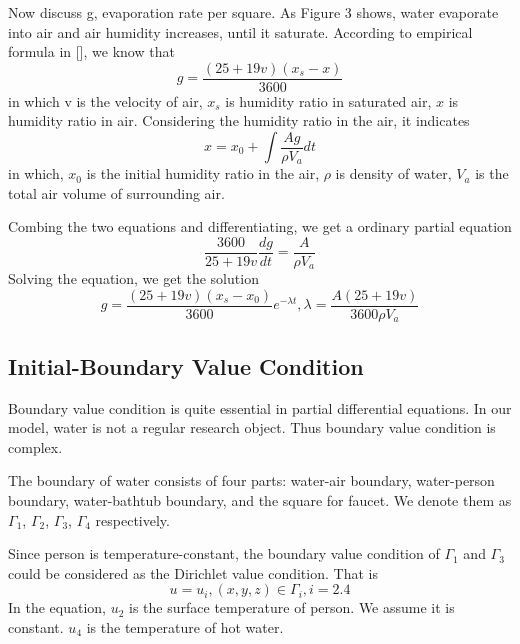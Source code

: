 \documentclass[12pt,a4paper,titlepage]{article}
\begin{document}
Now discuss g, evaporation rate per square.
As Figure 3 shows, water evaporate into air and air humidity increases, until it saturate. According to empirical formula in [], we know that
\begin{equation}
 g=\frac{(25+19v)({x_s}-x)}{3600}
\end{equation}
in which v is the velocity of air, ${x_s}$ is humidity ratio in saturated air, $x$ is humidity ratio in air.
Considering the humidity ratio in the air, it indicates
\begin{equation}
 x=x_0+\int \frac{Ag}{\rho V_a}dt
\end{equation}
in which, $x_0$ is the initial humidity ratio in the air, $\rho$ is density of water, $V_a$ is the total air volume of surrounding air.

Combing the two equations and differentiating, we get a ordinary partial equation
\begin{equation}
 \frac{3600}{25+19v} \frac{dg}{dt}=\frac{A}{\rho {V_a}}
\end{equation}
Solving the equation, we get the solution
\begin{equation}
 g=\frac{(25+19v)({x_s}-{x_0})}{3600}e^{-\lambda t}, \lambda =\frac{A(25+19v)}{3600\rho {V_a}}
\end{equation}


\subsection{Initial-Boundary Value Condition}
\label{initial-boundary value condition}

Boundary value condition is quite essential in partial differential equations. In our model, water is not a regular research object.
Thus boundary value condition is complex.

The boundary of water consists of four parts: water-air boundary, water-person boundary, water-bathtub boundary, and the square for faucet. We denote them as
${\Gamma}_1$, ${\Gamma}_2$, ${\Gamma}_3$, ${\Gamma}_4$ respectively.

Since person is temperature-constant, the boundary value condition of ${\Gamma}_1$ and ${\Gamma}_3$ could be considered
as the Dirichlet value condition. That is
\begin{equation}
 u=u_i, (x,y,z)\in {\Gamma}_i, i=2.4
\end{equation}
In the equation, $u_2$ is the surface temperature of person. We assume it is constant. $u_4$ is the temperature of hot water.
\end{document}
